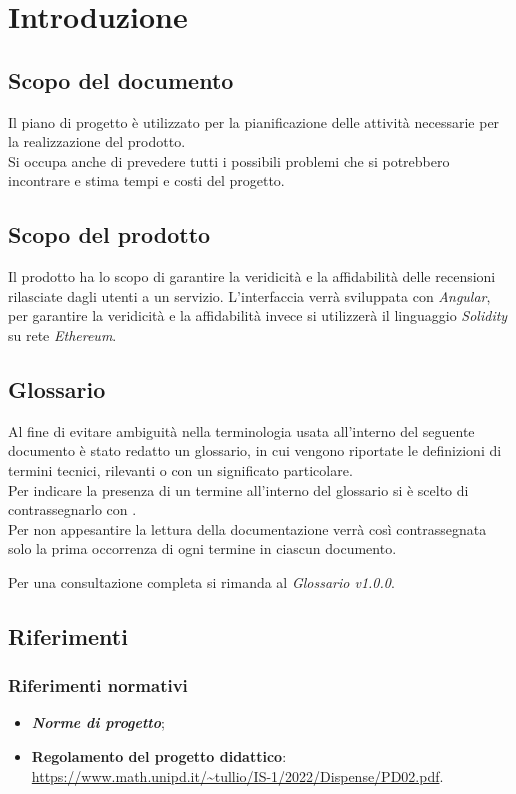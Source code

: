 \section{Introduzione}

\subsection{Scopo del documento}
Il piano di progetto è utilizzato per la pianificazione delle attività necessarie per la realizzazione del prodotto. \\
Si occupa anche di prevedere tutti i possibili problemi che si potrebbero incontrare e stima tempi e costi del progetto.

\subsection{Scopo del prodotto}
Il prodotto ha lo scopo di garantire la veridicità e la affidabilità 
delle recensioni rilasciate dagli utenti a un servizio. L'interfaccia verrà
sviluppata con \textit{Angular}, per garantire la veridicità e la affidabilità 
invece si utilizzerà il linguaggio \textit{Solidity} su rete \textit{Ethereum}.

\subsection{Glossario}
Al fine di evitare ambiguità nella terminologia usata all'interno del seguente
documento è stato redatto un glossario, in cui vengono riportate le definizioni
di termini tecnici, rilevanti o con un significato particolare. \\ Per indicare
la presenza di un termine all'interno del glossario si è scelto di
contrassegnarlo con \glo.\\ Per non appesantire la lettura della documentazione
verrà così contrassegnata solo la prima occorrenza di ogni termine in ciascun
documento.

Per una consultazione completa si rimanda al \textit{Glossario v1.0.0}.

\subsection{Riferimenti}
    \subsubsection{Riferimenti normativi}
    \begin{itemize}
        \item \textbf{\textit{Norme di progetto}};
        \item \textbf{Regolamento del progetto didattico}: \\
        \url{https://www.math.unipd.it/~tullio/IS-1/2022/Dispense/PD02.pdf}.
    \end{itemize}
